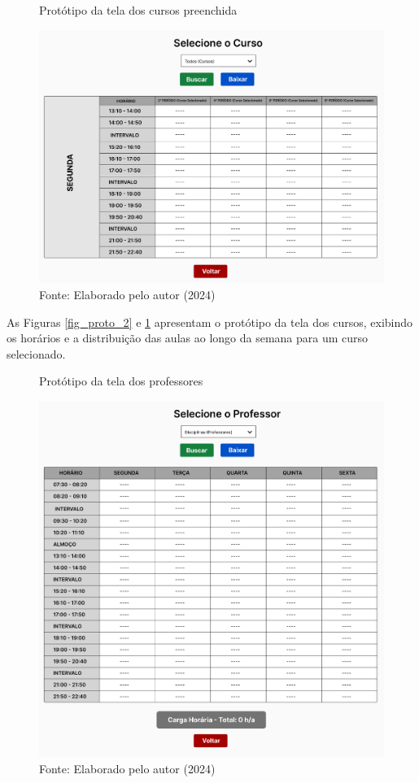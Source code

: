 \begin{figure}[htb]
    \centering
    \caption{Protótipo da tela dos cursos preenchida}
    \includegraphics[width=1\textwidth]{Figuras/proto-3.PNG}
    \caption*{Fonte: Elaborado pelo autor (2024)}
    \label{fig_proto_3}
\end{figure}

As Figuras \ref{fig_proto_2} e \ref{fig_proto_3} apresentam o protótipo da tela dos cursos, exibindo os horários e a distribuição das aulas ao longo da semana para um curso selecionado.

\begin{figure}[htb]
    \centering
    \caption{Protótipo da tela dos professores}
    \includegraphics[width=1\textwidth]{Figuras/proto-4.PNG}
    \caption*{Fonte: Elaborado pelo autor (2024)}
    \label{fig_proto_4}
\end{figure}

